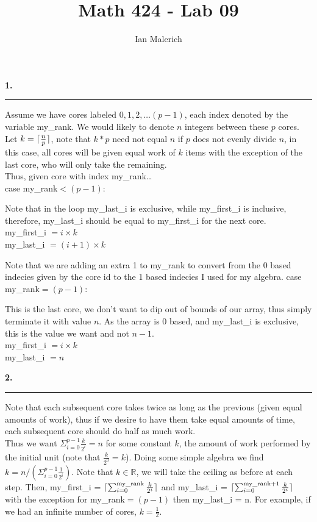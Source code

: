 \documentclass[12pt]{jhwhw}
\author{Ian Malerich}
\title{Math 424 - Lab 09}
\DeclarePairedDelimiter\ceil{\lceil}{\rceil}
\begin{document}
\raggedright

\textbf{1.}
\textcolor[RGB]{240,240,240}{\rule{\textwidth}{0.5pt}}\bigbreak

	\begin{addmargin}[1em]{}
		Assume we have cores labeled $0,1,2,\ldots (p-1)$, each index denoted by the variable
		my\_rank. We would likely to denote $n$ integers between these $p$ cores.
		Let $k = \ceil{\frac{n}{p}}$, note that $k*p$ need not equal $n$ if $p$ does
		not evenly divide $n$, in this case, all cores will be given equal work of $k$ items
		with the exception of the last core, who will only take the remaining. \\
		Thus, given core with index my\_rank\ldots \\
		case my\_rank$ < (p-1)$: \\
		\begin{addmargin}[2em]{}
			Note that in the loop my\_last\_i is exclusive, while my\_first\_i is inclusive,
			therefore, my\_last\_i should be equal to my\_first\_i for the next core. \\
			my\_first\_i $= i \times k$ \\
			my\_last\_i $= (i+1) \times k$ \\
		\end{addmargin}
		Note that we are adding an extra 1 to my\_rank to convert from the 0 based indecies
		given by the core id to the 1 based indecies I used for my algebra. 
		case my\_rank$ = (p-1)$: \\
		\begin{addmargin}[2em]{}
			This is the last core, we don't want to dip out of bounds of our array, thus
			simply terminate it with value $n$. As the array is 0 based, and my\_last\_i
			is exclusive, this is the value we want and not $n-1$. \\
			my\_first\_i $= i \times k$ \\
			my\_last\_i $= n$ \\
		\end{addmargin}
	\end{addmargin}

\bigbreak
\textbf{2.}
\textcolor[RGB]{240,240,240}{\rule{\textwidth}{0.5pt}}\bigbreak

	\begin{addmargin}[1em]{}
		Note that each subsequent core takes twice as long as the previous (given equal
		amounts of work), thus if we desire to have them take equal amounts of time,
		each subsequent core should do half as much work. \\
		Thus we want $\Sigma_{i=0}^{p-1} \frac{k}{2^i} = n$ for some constant $k$, the
		amount of work performed by the initial unit (note that $\frac{k}{2^0} = k$).
		Doing some simple algebra we find $k = n / (\Sigma_{i=0}^{p-1} \frac{1}{2^i})$.
		Note that $k\in \mathbb{R}$, we will take the ceiling as before at each step.
		Then, my\_first\_i = $\ceil{\sum_{i=0}^{\text{my\_rank}}\frac{k}{2^i}}$ and
		my\_last\_i = $\ceil{\sum_{i=0}^{\text{my\_rank+1}}\frac{k}{2^i}}$ with the exception
		for my\_rank$=(p-1)$ then my\_last\_i = n.
		For example, if we had an infinite number of cores, $k=\frac{1}{2}$.
		 
	\end{addmargin}
\end{document}

